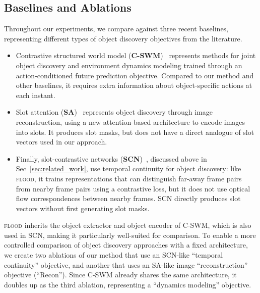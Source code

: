 \documentclass{article}
\newcommand{\jd}[1]{\textcolor{orange}{[DJ: #1]}}
\begin{document}

\subsection{Baselines and Ablations}

Throughout our experiments, we compare against three recent baselines, representing different types of object discovery objectives from the literature. 

\begin{itemize}[leftmargin=*]
 \item Contrastive structured world model (\textbf{C-SWM})~\cite{kipf2019contrastive} represents methods for joint object discovery and environment dynamics modeling trained through an action-conditioned future prediction objective. Compared to our method and other baselines, it requires extra information about object-specific actions at each instant. 
 \item  Slot attention (\textbf{SA})~\cite{locatello2020object} represents object discovery through image reconstruction, using a new attention-based architecture to encode images into slots. It produces slot masks, but does not have a direct analogue of slot vectors used in our approach. 
 \item  Finally, slot-contrastive networks (\textbf{SCN})~\cite{racah2020slot}, discussed above in Sec~\ref{sec:related_work}, use temporal continuity for object discovery: like \textsc{flood}, it trains representations that can distinguish far-away frame pairs from nearby frame pairs using a contrastive loss, but it does not use optical flow correspondences between nearby frames. SCN directly produces slot vectors without first generating slot masks.
\end{itemize}

\textsc{flood} inherits the object extractor and object encoder of C-SWM, which is also used in SCN, making it particularly well-suited for comparison. To enable a more controlled comparison of object discovery approaches with a fixed architecture, we create two ablations of our method that use an SCN-like ``temporal continuity'' objective, and another that uses an SA-like image ``reconstruction'' objective (``Recon''). Since C-SWM already shares the same architecture, it doubles up as the third ablation, representing a ``dynamics modeling'' objective. %
\end{document}
